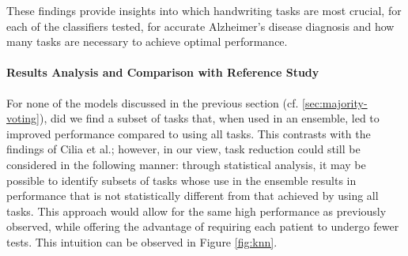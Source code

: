 \documentclass[a4paper, 11pt]{article}
\begin{document}
These findings provide insights into which handwriting tasks are most crucial, for each of the classifiers tested, for accurate Alzheimer's disease diagnosis and how many tasks are necessary to achieve optimal performance.



\paragraph{Results Analysis and Comparison with Reference Study}
For none of the models discussed in the previous section (cf. \ref{sec:majority-voting}), did we find a subset of tasks that, when used in an ensemble, led to improved performance compared to using all tasks. This contrasts with the findings of Cilia et al.; however, in our view, task reduction could still be considered in the following manner: through statistical analysis, it may be possible to identify subsets of tasks whose use in the ensemble results in performance that is not statistically different from that achieved by using all tasks. This approach would allow for the same high performance as previously observed, while offering the advantage of requiring each patient to undergo fewer tests. This intuition can be observed in Figure \ref{fig:knn}.
\end{document}

